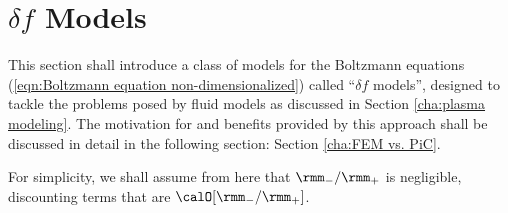 \section{$\delta\!f$ Models}\label{cha:delta f models}
    This section shall introduce a class of models for the Boltzmann equations (\ref{eqn:Boltzmann equation non-dimensionalized}) called ``$\delta\!f$ models'', designed to tackle the problems posed by fluid models as discussed in Section \ref{cha:plasma modeling}. The motivation for and benefits provided by this approach shall be discussed in detail in the following section: Section \ref{cha:FEM vs. PiC}.

    For simplicity, we shall assume from here that $\rmm_{-}/\rmm_{+}$ is negligible, discounting terms that are $\calO[\rmm_{-}/\rmm_{+}]$.

    \line

